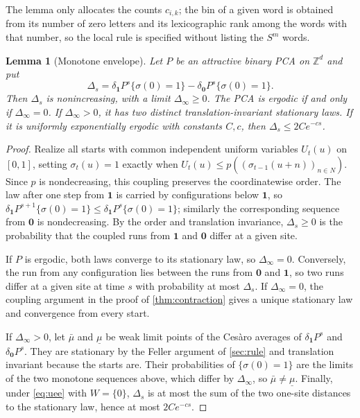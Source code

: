 \documentclass[11pt]{article}
\theoremstyle{plain}
\newtheorem{lemma}[theorem]{Lemma}
\theoremstyle{definition}
\theoremstyle{remark}
\newcommand{\Z}{\mathbb Z}
\begin{document}
The lemma only allocates the counts $c_{i,k}$; the bin of a given word is obtained from its number of zero letters and its lexicographic rank among the words with that number, so the local rule is specified without listing the $S^m$ words.

\begin{lemma}[Monotone envelope]\label{lem:envelope}
Let $P$ be an attractive binary PCA on $\Z^d$ and put
\[
 \Delta_s=\delta_{\mathbf1}P^s\{\sigma(0)=1\}-\delta_{\mathbf0}P^s\{\sigma(0)=1\}.
\]
Then $\Delta_s$ is nonincreasing, with a limit $\Delta_\infty\geq0$. The PCA is ergodic if and only if $\Delta_\infty=0$. If $\Delta_\infty>0$, it has two distinct translation-invariant stationary laws. If it is uniformly exponentially ergodic with constants $C,c$, then $\Delta_s\leq2Ce^{-cs}$.
\end{lemma}

\begin{proof}
Realize all starts with common independent uniform variables $U_t(u)$ on $[0,1]$, setting $\sigma_t(u)=1$ exactly when $U_t(u)\leq p((\sigma_{t-1}(u+n))_{n\in N})$. Since $p$ is nondecreasing, this coupling preserves the coordinatewise order. The law after one step from $\mathbf1$ is carried by configurations below $\mathbf1$, so $\delta_{\mathbf1}P^{s+1}\{\sigma(0)=1\}\leq\delta_{\mathbf1}P^s\{\sigma(0)=1\}$; similarly the corresponding sequence from $\mathbf0$ is nondecreasing. By the order and translation invariance, $\Delta_s\geq0$ is the probability that the coupled runs from $\mathbf1$ and $\mathbf0$ differ at a given site.

If $P$ is ergodic, both laws converge to its stationary law, so $\Delta_\infty=0$. Conversely, the run from any configuration lies between the runs from $\mathbf0$ and $\mathbf1$, so two runs differ at a given site at time $s$ with probability at most $\Delta_s$. If $\Delta_\infty=0$, the coupling argument in the proof of \cref{thm:contraction} gives a unique stationary law and convergence from every start.

If $\Delta_\infty>0$, let $\bar\mu$ and $\underline\mu$ be weak limit points of the Ces\`aro averages of $\delta_{\mathbf1}P^s$ and $\delta_{\mathbf0}P^s$. They are stationary by the Feller argument of \cref{sec:rule} and translation invariant because the starts are. Their probabilities of $\{\sigma(0)=1\}$ are the limits of the two monotone sequences above, which differ by $\Delta_\infty$, so $\bar\mu\neq\underline\mu$. Finally, under \eqref{eq:uee} with $W=\{0\}$, $\Delta_s$ is at most the sum of the two one-site distances to the stationary law, hence at most $2Ce^{-cs}$.
\end{proof}
\end{document}
